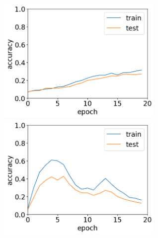 \documentclass[11pt,a4paper,uplatex,draft]{ujarticle}
\begin{document}
  \begin{figure}[tbp]
    \begin{minipage}[b]{0.5\textwidth}
      \centering
      \includegraphics[keepaspectratio, width=80mm]{Images/python/acc_202402051754.png}
    \end{minipage}
    \begin{minipage}[b]{0.5\textwidth}
      \centering
      \includegraphics[keepaspectratio, width=80mm]{Images/python/acc_202402052233.png}
    \end{minipage}
  \end{figure}
\end{document}
